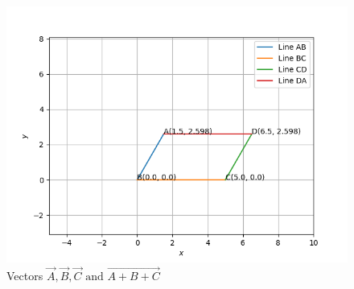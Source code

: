 \documentclass[journal]{IEEEtran}
\begin{document}
\begin{figure}[H]
   \centering
  \includegraphics[width=0.64\columnwidth]{figs/fig.png}
   \caption{Vectors $\vec{A}, \vec{B}, \vec{C} \text{ and } \vec{A+B+C}$}
   \label{stemplot}
\end{figure}
\end{document}
